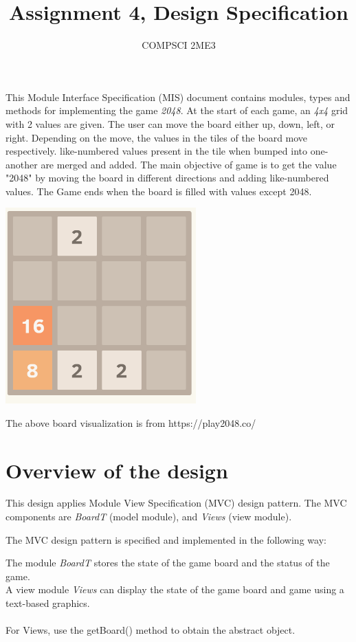 \documentclass[12pt]{article}
\title{Assignment 4, Design Specification}
\author{COMPSCI 2ME3}
\begin{document}
\maketitle
This Module Interface Specification (MIS) document contains modules, types and
methods for implementing the game \textit{2048}. At the start of each game, an \textit{4x4} grid with 2 values are given.
The user can move the board either up, down, left, or right. Depending on the move,  the values in the tiles of the board move respectively.
like-numbered values present in the tile when bumped into one-another are merged and added. The main objective of game is to get
the value "2048" by moving the board in different directions and adding like-numbered values. The Game ends when the board is filled with values
except 2048.

\begin{center}
 \includegraphics[width=0.55\textwidth]{2048_visual.png}

  The above board visualization is from https://play2048.co/
\end{center}

\newpage

\section{Overview of the design}

This design applies Module View Specification (MVC) design pattern. The MVC components
are \textit{BoardT} (model module), and \textit{Views} (view module). 

\medskip

\begin{flushleft}
The MVC design pattern is specified and implemented in the following way:
\end{flushleft}
 The module \textit{BoardT} stores the state of the game board and the status of the game.\\ A view module \textit{Views} can display
the state of the game board and game using a text-based graphics.\\
\\
For Views, use the getBoard() method to obtain the abstract object.
\bigskip
\end{document}
